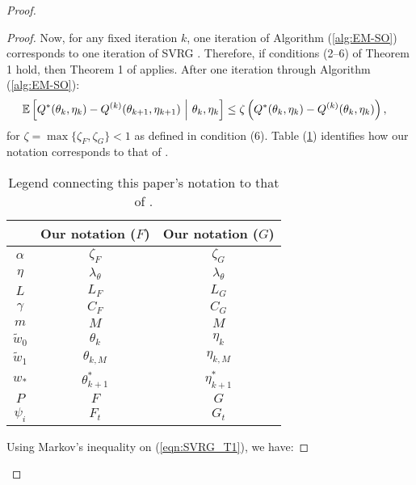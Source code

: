 \begin{proof}
\begin{proof}
Now, for any fixed iteration $k$, one iteration of Algorithm (\ref{alg:EM-SO}) corresponds to one iteration of SVRG \citep{Johnson:2013}. Therefore, if conditions (2--6) of Theorem 1 hold, then Theorem 1 of \citet{Johnson:2013} applies. 
After one iteration through Algorithm (\ref{alg:EM-SO}):
%
\begin{align}
    \mathbb{E} & \left[Q^*(\theta_{k},\eta_{k}) - Q^{(k)}(\theta_{k+1},\eta_{k+1}) ~\Big\vert~ \theta_k, \eta_k \right] \leq \zeta \left( Q^*(\theta_{k},\eta_{k}) - Q^{(k)}(\theta_k,\eta_k) \right), \label{eqn:SVRG_T1}
\end{align}
%
for $\zeta = \max\{\zeta_F, \zeta_G\} < 1$ as defined in condition (6). Table (\ref{tbl:notation}) identifies how our notation corresponds to that of \citet{Johnson:2013}.
%
\begin{table}[]
\centering
\begin{tabular}{c|c|c}
\citet{Johnson:2013}                  & Our notation ($F$) & Our notation ($G$) \\ \hline
$\alpha$                              & $\zeta_F$     & $\zeta_G$       \\
$\eta$                                & $\lambda_\theta$   & $\lambda_\theta$   \\
$L$                                   & $L_F$              & $L_G$              \\
$\gamma$                              & $C_F$              & $C_G$              \\
$m$                                   & $M$                & $M$                \\
$\tilde{w}_0$                         & $\theta_k$         & $\eta_k$          \\
$\tilde{w}_1$                         & $\theta_{k,M}$     & $\eta_{k,M}$        \\
$w_{*}$                               & $\theta^*_{k+1}$   & $\eta^*_{k+1}$      \\
$P$                                   & $F$                & $G$                \\
$\psi_i$                              & $F_t$              & $G_t$             
\end{tabular}
\caption{Legend connecting this paper's notation to that of \citet{Johnson:2013}.}
\label{tbl:notation}
\end{table}
%
Using Markov's inequality on (\ref{eqn:SVRG_T1}), we have:


\end{proof}
\end{proof}
